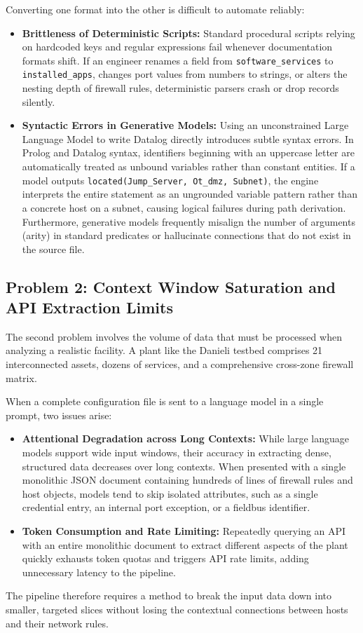 \documentclass[target=mst,aauheader=aics,style=]{thud}
\begin{document}
Converting one format into the other is difficult to automate reliably:
\begin{itemize}
    \item \textbf{Brittleness of Deterministic Scripts:} Standard procedural scripts relying on hardcoded keys and regular expressions fail whenever documentation formats shift. If an engineer renames a field from \texttt{software\_services} to \texttt{installed\_apps}, changes port values from numbers to strings, or alters the nesting depth of firewall rules, deterministic parsers crash or drop records silently.
    \item \textbf{Syntactic Errors in Generative Models:} Using an unconstrained Large Language Model to write Datalog directly introduces subtle syntax errors. In Prolog and Datalog syntax, identifiers beginning with an uppercase letter are automatically treated as unbound variables rather than constant entities. If a model outputs \texttt{located(Jump\_Server, Ot\_dmz, Subnet)}, the engine interprets the entire statement as an ungrounded variable pattern rather than a concrete host on a subnet, causing logical failures during path derivation. Furthermore, generative models frequently misalign the number of arguments (arity) in standard predicates or hallucinate connections that do not exist in the source file.
\end{itemize}

\subsection{Problem 2: Context Window Saturation and API Extraction Limits}
The second problem involves the volume of data that must be processed when analyzing a realistic facility. A plant like the Danieli testbed comprises 21 interconnected assets, dozens of services, and a comprehensive cross-zone firewall matrix.

When a complete configuration file is sent to a language model in a single prompt, two issues arise:
\begin{itemize}
    \item \textbf{Attentional Degradation across Long Contexts:} While large language models support wide input windows, their accuracy in extracting dense, structured data decreases over long contexts. When presented with a single monolithic JSON document containing hundreds of lines of firewall rules and host objects, models tend to skip isolated attributes, such as a single credential entry, an internal port exception, or a fieldbus identifier.
    \item \textbf{Token Consumption and Rate Limiting:} Repeatedly querying an API with an entire monolithic document to extract different aspects of the plant quickly exhausts token quotas and triggers API rate limits, adding unnecessary latency to the pipeline.
\end{itemize}
The pipeline therefore requires a method to break the input data down into smaller, targeted slices without losing the contextual connections between hosts and their network rules.
\end{document}
